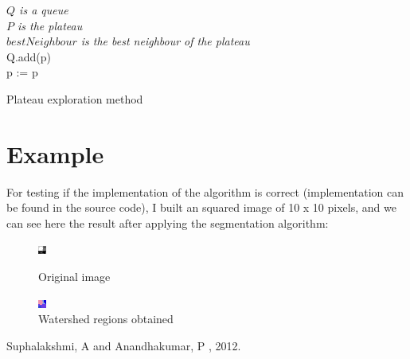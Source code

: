 \documentclass{article}
\begin{document}
\begin{algorithm}[H]
 \emph{$Q$ is a queue}\\
 \emph{$P$ is the plateau}\\
 \emph{$bestNeighbour$ is the best neighbour of the plateau}\\
 
 Q.add(p)\\
 p := p

 

 \caption{Plateau exploration method}
\end{algorithm}

\section{Example}

For testing if the implementation of the algorithm is correct (implementation can be found in the source code), I built an squared image of 10 x 10 pixels, and we can see here the result after applying the segmentation algorithm:

\begin{figure}[!h]
    \centering
  \includegraphics[scale=5]{report/segmentation/image/test.png}
  \caption{Original image}\label{fig:image-1}
\endminipage\hfill
{}
    \centering
  \includegraphics[scale=5]{report/segmentation/image/test-out.png}
  \caption{Watershed regions obtained}\label{fig:awesome_image2}
\endminipage\hfill
\end{figure}

\begin{thebibliography}{9}
   Suphalakshmi, A and Anandhakumar, P
    , 2012.

\end{thebibliography}
\end{document}
